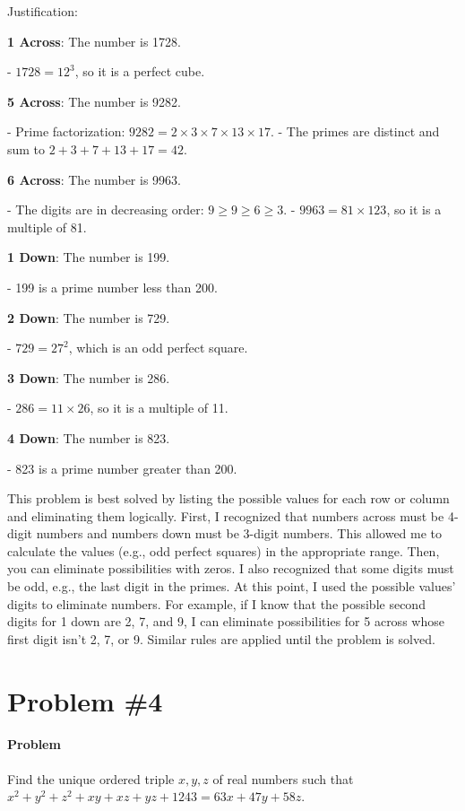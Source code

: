\documentclass[10pt]{article}
\theoremstyle{plain}
\theoremstyle{definition}
\theoremstyle{remark}
\begin{document}
Justification:

\textbf{1 Across}: The number is 1728.

- \(1728 = 12^3\), so it is a perfect cube.

\textbf{5 Across}: The number is 9282.

- Prime factorization: \(9282 = 2 \times 3 \times 7 \times 13 \times 17\).
- The primes are distinct and sum to \(2 + 3 + 7 + 13 + 17 = 42\).

\textbf{6 Across}: The number is 9963.

- The digits are in decreasing order: \(9 \geq 9 \geq 6 \geq 3\).
- \(9963 = 81 \times 123\), so it is a multiple of 81.


\textbf{1 Down}: The number is 199.

- 199 is a prime number less than 200.

\textbf{2 Down}: The number is 729.

- \(729 = 27^2\), which is an odd perfect square.

\textbf{3 Down}: The number is 286.

- \(286 = 11 \times 26\), so it is a multiple of 11.

\textbf{4 Down}: The number is 823.

- 823 is a prime number greater than 200.

This problem is best solved by listing the possible values for each row or column and eliminating them logically. First, I recognized that numbers across must be 4-digit numbers and numbers down must be 3-digit numbers. This allowed me to calculate the values (e.g., odd perfect squares) in the appropriate range. Then, you can eliminate possibilities with zeros. I also recognized that some digits must be odd, e.g., the last digit in the primes. At this point, I used the possible values' digits to eliminate numbers. For example, if I know that the possible second digits for 1 down are 2, 7, and 9, I can eliminate possibilities for 5 across whose first digit isn't 2, 7, or 9. Similar rules are applied until the problem is solved. 

\section{Problem \#4}

\paragraph{Problem} Find the unique ordered triple \(x,y,z\) of real numbers such that \(x^2+y^2+z^2+xy+xz+yz+1243=63x+47y+58z\).
\end{document}
